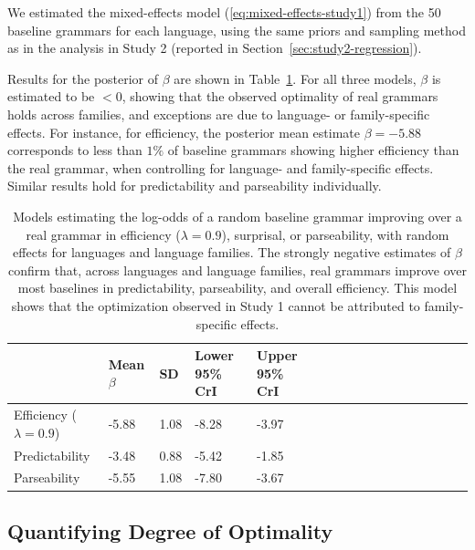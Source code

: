 \documentclass[10pt,twoside,lineno]{article}
\begin{document}
We estimated the mixed-effects model (\ref{eq:mixed-effects-study1}) from the 50 baseline grammars for each language, using the same priors and sampling method as in the analysis in Study 2 (reported in Section~\ref{sec:study2-regression}).

Results for the posterior of $\beta$ are shown in Table~\ref{tab:study1-glmer}.
For all three models, $\beta$ is estimated to be $< 0$, showing that the observed optimality of real grammars holds across families, and exceptions are due to language- or family-specific effects.
For instance, for efficiency, the posterior mean estimate $\beta=-5.88$ corresponds to  less than $1\%$ of baseline grammars showing higher efficiency than the real grammar, when controlling for language- and family-specific effects.
Similar results hold for predictability and parseability individually.


\begin{table}
\small{
\begin{center}
\begin{tabular}{|l||l|lll|llll|ll|llllll}
\hline
	& Mean $\beta$ & SD & Lower 95\% CrI & Upper 95\% CrI \\
\hline\hline
	Efficiency ($\lambda=0.9$) &	-5.88   &   1.08  &  -8.28  &  -3.97  \\
	Predictability & -3.48   &   0.88  &  -5.42  &  -1.85   \\
	Parseability & -5.55   &   1.08  &  -7.80  &  -3.67    \\
\hline
\end{tabular}
\end{center}
}
\caption{Models estimating the log-odds of a random baseline grammar improving over a real grammar in efficiency ($\lambda=0.9$), surprisal, or parseability, with random effects for languages and language families. The strongly negative estimates of $\beta$ confirm that, across languages and language families, real grammars improve over most baselines in predictability, parseability, and overall efficiency. This model shows that the optimization observed in Study 1 cannot be attributed to family-specific effects.}\label{tab:study1-glmer}
\end{table}

\subsection{Quantifying Degree of Optimality}
\end{document}
